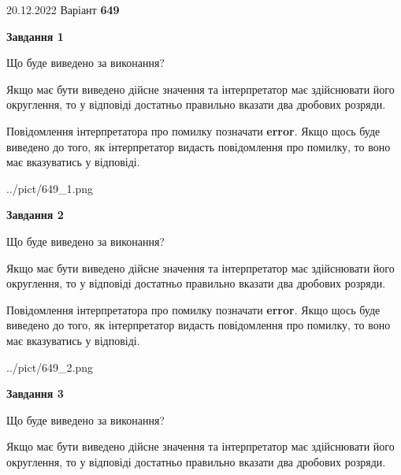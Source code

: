 \documentclass[12pt, ukrainian]{article}
\begin{document}
{20.12.2022 Варіант \No \textbf { 649 }\par}
{
\begin {Large}

{\begin {center}\textbf{Завдання 1}\end {center}}\par
Що буде виведено за виконання? \par

Якщо має бути виведено дійсне значення та інтерпретатор має здійснювати його округлення, 
то у відповіді достатньо правильно вказати два дробових розряди.

Повідомлення інтерпретатора про помилку позначати \textbf{error}.
Якщо щось буде виведено до того, як інтерпретатор видасть повідомлення про помилку, 
то воно має вказуватись у відповіді. \par

\begin{center}
	{../pict/649_1.png}
\end{center}
\newpage

{\begin {center}\textbf{Завдання 2}\end {center}}\par
Що буде виведено за виконання? \par

Якщо має бути виведено дійсне значення та інтерпретатор має здійснювати його округлення, 
то у відповіді достатньо правильно вказати два дробових розряди.

Повідомлення інтерпретатора про помилку позначати \textbf{error}.
Якщо щось буде виведено до того, як інтерпретатор видасть повідомлення про помилку, 
то воно має вказуватись у відповіді. \par

\begin{center}
	{../pict/649_2.png}
\end{center}
\newpage

{\begin {center}\textbf{Завдання 3}\end {center}}\par
Що буде виведено за виконання? \par

Якщо має бути виведено дійсне значення та інтерпретатор має здійснювати його округлення, 
то у відповіді достатньо правильно вказати два дробових розряди.


\end{Large}}
\end{document}
